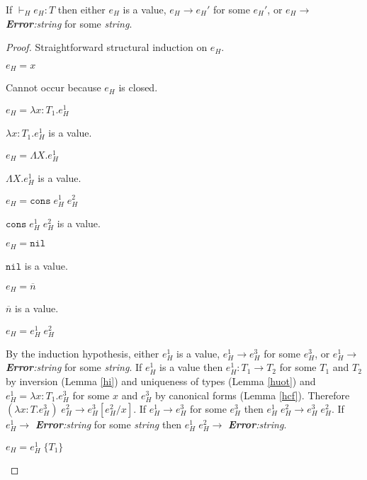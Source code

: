 \begin{theorem}
\label{hps}
\onehalfspacing
If $\vdash_{H}e_{H}:T$ then either $e_{H}$ is a value, $e_{H}\rightarrow e_{H}'$ for some $e_{H}'$, or $e_{H}\rightarrow$ \emph{\textbf{Error}:\;string} for some \emph{string}.
\begin{proof}
Straightforward structural induction on $e_{H}$.
\begin{case}
$e_{H}=x$

Cannot occur because $e_{H}$ is closed.
\end{case}
\begin{case}
$e_{H}=\lambda x:T_{1}.e_{H}^{1}$

$\lambda x:T_{1}.e_{H}^{1}$ is a value.
\end{case}
\begin{case}
$e_{H}=\Lambda X.e_{H}^{1}$

$\Lambda X.e_{H}^{1}$ is a value.
\end{case}
\begin{case}
$e_{H}=\mathtt{cons}\;e_{H}^{1}\;e_{H}^{2}$

$\mathtt{cons}\;e_{H}^{1}\;e_{H}^{2}$ is a value.
\end{case}
\begin{case}
$e_{H}=\mathtt{nil}$

$\mathtt{nil}$ is a value.
\end{case}
\begin{case}
$e_{H}=\overline{n}$

$\overline{n}$ is a value.
\end{case}
\begin{case}
$e_{H}=e_{H}^{1}\;e_{H}^{2}$

By the induction hypothesis, either $e_{H}^{1}$ is a value, $e_{H}^{1}\rightarrow e_{H}^{3}$ for some $e_{H}^{3}$, or $e_{H}^{1}\rightarrow$ \emph{\textbf{Error}:\;string} for some \emph{string}.  If $e_{H}^{1}$ is a value then $e_{H}^{1}:T_{1}\rightarrow T_{2}$ for some $T_{1}$ and $T_{2}$ by inversion (Lemma \ref{hi}) and uniqueness of types (Lemma \ref{huot}) and $e_{H}^{1}=\lambda x:T_{1}.e_{H}^{3}$ for some $x$ and $e_{H}^{3}$ by canonical forms (Lemma \ref{hcf}).  Therefore $(\lambda x:T.e_{H}^{3})\;e_{H}^{2}\rightarrow e_{H}^{3}[e_{H}^{2}/x]$.  If $e_{H}^{1}\rightarrow e_{H}^{3}$ for some $e_{H}^{3}$ then $e_{H}^{1}\;e_{H}^{2}\rightarrow e_{H}^{3}\;e_{H}^{2}$.  If $e_{H}^{1}\rightarrow$ \emph{\textbf{Error}:\;string} for some \emph{string} then $e_{H}^{1}\;e_{H}^{2}\rightarrow$ \emph{\textbf{Error}:\;string}.
\end{case}
\begin{case}
$e_{H}=e_{H}^{1}\;\lbrace T_{1}\rbrace$


\end{case}
\end{proof}
\end{theorem}
